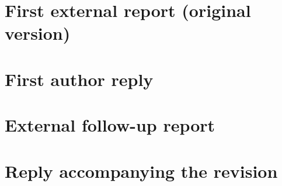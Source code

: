 \clearpage
\section{First external report (original version)}
\label{app:review-original}
\begingroup
\small

\endgroup

\clearpage
\section{First author reply}
\label{app:reply-original}
\begingroup
\small

\endgroup

\clearpage
\section{External follow-up report}
\label{app:review-followup}
\begingroup
\small

\endgroup

\clearpage
\section{Reply accompanying the revision}
\label{app:reply-final}
\begingroup
\small

\endgroup
